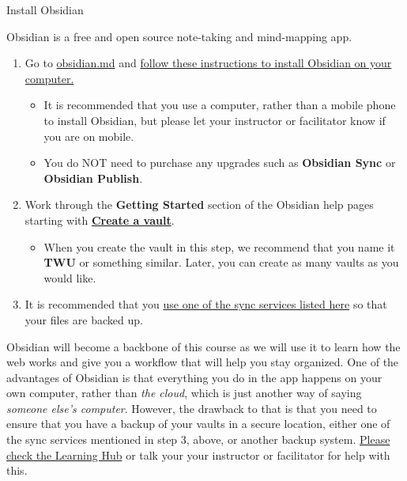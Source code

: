 \documentclass[
]{book}
\providecommand{\tightlist}{%
  \setlength{\itemsep}{0pt}\setlength{\parskip}{0pt}}
\theoremstyle{definition}
\theoremstyle{definition}
\theoremstyle{definition}
\theoremstyle{definition}
\theoremstyle{remark}
\begin{document}
\begin{reflect}
{Install Obsidian}

Obsidian is a free and open source note-taking and mind-mapping app.

\begin{enumerate}
\def\labelenumi{\arabic{enumi}.}
\tightlist
\item
  Go to \href{https://obsidian.md/download}{obsidian.md} and \href{https://help.obsidian.md/Getting+started/Download+and+install+Obsidian}{follow these instructions to install Obsidian on your computer.}

  \begin{itemize}
  \tightlist
  \item
    It is recommended that you use a computer, rather than a mobile phone to install Obsidian, but please let your instructor or facilitator know if you are on mobile.
  \item
    You do NOT need to purchase any upgrades such as \textbf{Obsidian Sync} or \textbf{Obsidian Publish}.
  \end{itemize}
\item
  Work through the \textbf{Getting Started} section of the Obsidian help pages starting with \textbf{\href{https://help.obsidian.md/Getting+started/Create+a+vault}{Create a vault}}.

  \begin{itemize}
  \tightlist
  \item
    When you create the vault in this step, we recommend that you name it \textbf{TWU} or something similar. Later, you can create as many vaults as you would like.
  \end{itemize}
\item
  It is recommended that you \href{https://help.obsidian.md/Getting+started/Sync+your+notes+across+devices}{use one of the sync services listed here} so that your files are backed up.
\end{enumerate}
\end{reflect}

Obsidian will become a backbone of this course as we will use it to learn how the web works and give you a workflow that will help you stay organized. One of the advantages of Obsidian is that everything you do in the app happens on your own computer, rather than \emph{the cloud}, which is just another way of saying \emph{someone else's computer}. However, the drawback to that is that you need to ensure that you have a backup of your vaults in a secure location, either one of the sync services mentioned in step 3, above, or another backup system. \href{https://twu.discourse.group/c/ldrs101/10}{Please check the Learning Hub} or talk your your instructor or facilitator for help with this.
\end{document}
